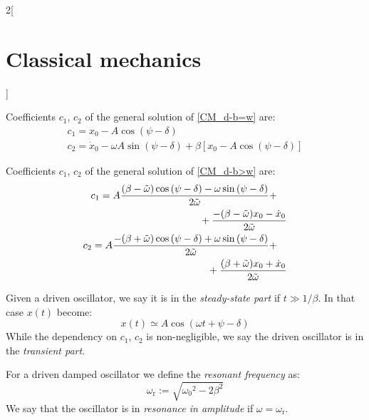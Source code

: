 \documentclass[../../../main_physics.tex]{subfiles}
\begin{document}
\begin{multicols}{2}[\section{Classical mechanics}]
\begin{proposition}
  \end{proposition}
  \begin{proposition}
    Coefficients $c_1$, $c_2$ of the general solution of \cref{CM_d-b=w} are:
    \begin{gather*}
      c_1=x_0-A\cos\left(\psi-\delta\right)\\
      c_2=\dot{x}_0-\omega A\sin\left(\psi-\delta\right)+\beta\left[x_0-A\cos\left(\psi-\delta\right)\right]
    \end{gather*}
  \end{proposition}
  \begin{proposition}
    Coefficients $c_1$, $c_2$ of the general solution of \cref{CM_d-b>w} are:
    \begin{equation*}
      \begin{split}
        \begin{multlined}[t]
          c_1=A\frac{(\beta-\Tilde{\omega})\cos\left(\psi-\delta\right)-\omega\sin\left(\psi-\delta\right)}{2\Tilde{\omega}}+\\+\frac{-(\beta-\Tilde{\omega})x_0-\dot{x}_0}{2\Tilde{\omega}}
        \end{multlined}\\
        \begin{multlined}[t]
          c_2=A\frac{-(\beta+\Tilde{\omega})\cos\left(\psi-\delta\right)+\omega\sin\left(\psi-\delta\right)}{2\Tilde{\omega}}+\\+\frac{(\beta+\Tilde{\omega})x_0+\dot{x}_0}{2\Tilde{\omega}}
        \end{multlined}
      \end{split}
    \end{equation*}
  \end{proposition}
  \begin{definition}
    Given a driven oscillator, we say it is in the \emph{steady-state part} if $t\gg 1/\beta$. In that case $x(t)$ become: $$x(t)\simeq A\cos(\omega t+\psi-\delta)$$ While the dependency on $c_1$, $c_2$ is non-negligible, we say the driven oscillator is in the \emph{transient part}.
  \end{definition}
  \begin{definition}
    For a driven damped oscillator we define the \emph{resonant frequency} as: $$\omega_\text{r}:=\sqrt{{\omega_0}^2-2\beta^2}$$ We say that the oscillator is in \emph{resonance in amplitude} if $\omega=\omega_\text{r}$.
  \end{definition}
  \begin{proposition}

\end{proposition}
\end{multicols}
\end{document}

